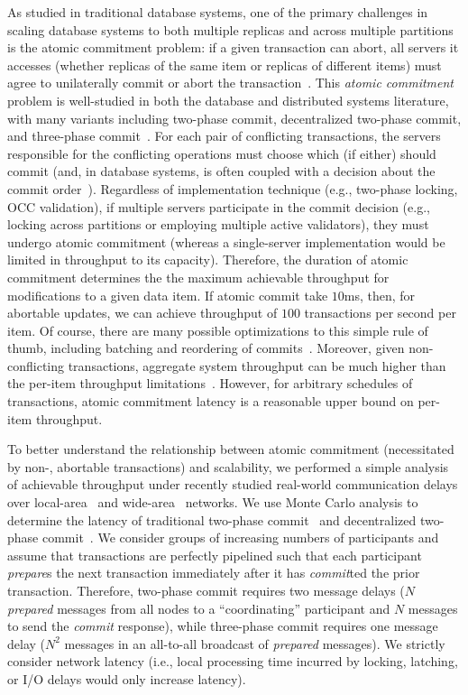As studied in traditional database systems, one of the primary
challenges in scaling database systems to both multiple replicas and
across multiple partitions is the atomic commitment problem: if a
given transaction can abort, all servers it accesses (whether replicas
of the same item or replicas of different items) must agree to
unilaterally commit or abort the
transaction~\cite{bernstein-book}. This \textit{atomic commitment}
problem is well-studied in both the database and distributed systems
literature, with many variants including two-phase commit,
decentralized two-phase commit, and three-phase
commit~\cite{atomictransactions,paxos-commit,traiger-tods}. For each
pair of conflicting transactions, the servers responsible for the
conflicting operations must choose which (if either) should commit
(and, in database systems, is often coupled with a decision about the
commit order~\cite{hat-vldb,calvin,traiger-tods}). Regardless of
implementation technique (e.g., two-phase locking, OCC validation), if
multiple servers participate in the commit decision (e.g., locking
across partitions or employing multiple active validators), they must
undergo atomic commitment (whereas a single-server implementation
would be limited in throughput to its capacity). Therefore, the
duration of atomic commitment determines the the maximum achievable
throughput for modifications to a given data item. If atomic commit
take $10$ms, then, for abortable updates, we can achieve throughput of
$100$ transactions per second per item. Of course, there are many
possible optimizations to this simple rule of thumb, including
batching and reordering of commits~\cite{calvin}. Moreover, given
non-conflicting transactions, aggregate system throughput can be much
higher than the per-item throughput limitations~\cite{spanner,
  f1}. However, for arbitrary schedules of transactions, atomic
commitment latency is a reasonable upper bound on per-item throughput.

To better understand the relationship between atomic commitment
(necessitated by non-\iconfluent, abortable transactions) and
scalability, we performed a simple analysis of achievable throughput
under recently studied real-world communication delays over
local-area~\cite{bobtail} and wide-area~\cite{hat-vldb} networks. We
use Monte Carlo analysis to determine the latency of traditional
two-phase commit~\cite{bernstein-book} and decentralized two-phase
commit~\cite{paxos-commit}. We consider groups of increasing numbers
of participants and assume that transactions are perfectly pipelined
such that each participant \textit{prepare}s the next transaction
immediately after it has \textit{commit}ted the prior
transaction. Therefore, two-phase commit requires two message delays
($N$ \textit{prepared} messages from all nodes to a ``coordinating''
participant and $N$ messages to send the \textit{commit} response),
while three-phase commit requires one message delay ($N^2$ messages in
an all-to-all broadcast of \textit{prepared} messages). We strictly
consider network latency (i.e., local processing time incurred by
locking, latching, or I/O delays would only increase latency).

